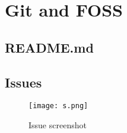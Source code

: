 \documentclass[titlepage]{article}
\begin{document}
	\section{Git and FOSS}
	\subsection{README.md}
	\subsection{Issues}
	\begin{figure}[ht]
	\centering
	\texttt{[image: s.png]}
	\caption{Issue screenshot}
	\end{figure}
\end{document}
